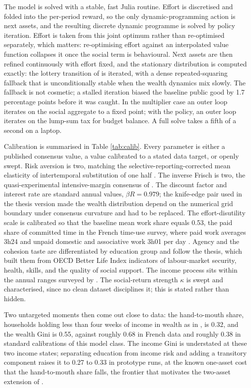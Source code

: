 \documentclass[11pt]{article}
\begin{document}
The model is solved with a stable, fast Julia routine. Effort is discretised and folded into the per-period reward, so the only dynamic-programming action is next assets, and the resulting discrete dynamic programme is solved by policy iteration. Effort is taken from this joint optimum rather than re-optimised separately, which matters: re-optimising effort against an interpolated value function collapses it once the social term is behavioural. Next assets are then refined continuously with effort fixed, and the stationary distribution is computed exactly: the lottery transition of \citet{young2010} is iterated, with a dense repeated-squaring fallback that is unconditionally stable when the wealth dynamics mix slowly. The fallback is not cosmetic; a stalled iteration biased the baseline public good by 1.7 percentage points before it was caught. In the multiplier case an outer loop iterates on the social aggregate to a fixed point; with the policy, an outer loop iterates on the lump-sum tax for budget balance. A full solve takes a fifth of a second on a laptop.

Calibration is summarised in Table \ref{tab:calib}. Every parameter is either a published consensus value, a value calibrated to a stated data target, or openly swept. Risk aversion is two, matching the selective-reporting-corrected mean elasticity of intertemporal substitution of one half \citep{havranek2015}. The inverse Frisch is two, the quasi-experimental intensive-margin consensus of \citet{chetty2011}. The discount factor and interest rate are standard annual values, $\beta R = 0.979$; the knife-edge pair used in the thesis version made the wealth distribution depend on the numerical grid boundary under consensus curvature and had to be replaced. The effort-disutility scale is calibrated so that the baseline mean work share equals 0.53, the paid share of committed time in the French time-use survey, where paid work averages 3h24 and unpaid domestic and associative work 3h01 per day \citep{roy2012}. Agency and the cohesion taste are differentiated by education group and follow the thesis, which built them from OECD Better Life Index indicators of labour-market security, health, skills, and the quality of social support. The income process sits within the annual ranges surveyed by \citet{heathcote2010}. The social-return strength $\kappa$ is swept and characterised, since no clean dataset disciplines it; this is stated rather than hidden.

Two untargeted moments then come out close to data: the hand-to-mouth share, households holding less than four weeks of income in wealth as in \citet{kaplan2014}, is 0.32, and the wealth Gini is 0.55, against roughly 0.68 in French data \citep{conway2025atlas} and roughly 0.38 in standard calibrations of this model class. The income Gini is understated at these two income states; separating education from income risk and adding a transitory component raises it to 0.27 to 0.33 in prototype runs, at the known one-asset cost that the hand-to-mouth share falls, the frontier that motivates the two-asset extension of \citet{kaplan2014}.
\end{document}
